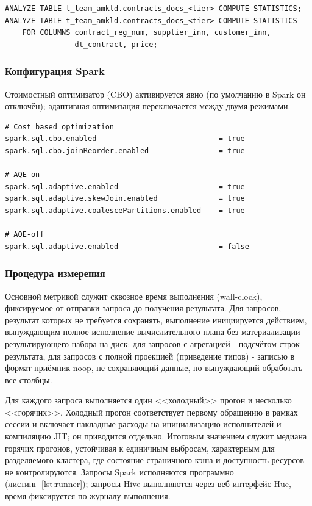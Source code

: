 \documentclass[12pt,letterpaper, onecolumn]{exam}
\begin{document}
\begin{lstlisting}[style=sparkconf, caption={Сбор статистики}, label={lst:analyze}]
ANALYZE TABLE t_team_amkld.contracts_docs_<tier> COMPUTE STATISTICS;
ANALYZE TABLE t_team_amkld.contracts_docs_<tier> COMPUTE STATISTICS
    FOR COLUMNS contract_reg_num, supplier_inn, customer_inn,
                dt_contract, price;
\end{lstlisting}

\subsubsection{Конфигурация Spark}
Стоимостный оптимизатор (CBO) активируется явно (по умолчанию в Spark он отключён);
адаптивная оптимизация переключается между двумя режимами.

\begin{lstlisting}[style=sparkconf, caption={Конфигурация CBO и AQE в Spark}, label={lst:spark-opt}]
# Cost based optimization
spark.sql.cbo.enabled                            = true
spark.sql.cbo.joinReorder.enabled                = true

# AQE-on
spark.sql.adaptive.enabled                       = true
spark.sql.adaptive.skewJoin.enabled              = true
spark.sql.adaptive.coalescePartitions.enabled    = true

# AQE-off
spark.sql.adaptive.enabled                       = false
\end{lstlisting}

\subsubsection{Процедура измерения}
Основной метрикой служит сквозное время выполнения (wall-clock), фиксируемое
от отправки запроса до получения результата. Для запросов, результат которых
не требуется сохранять, выполнение инициируется действием, вынуждающим полное
исполнение вычислительного плана без материализации результирующего набора
на диск: для запросов с агрегацией - подсчётом строк результата, для запросов
с полной проекцией (приведение типов) - записью в формат-приёмник noop,
не сохраняющий данные, но вынуждающий обработать все столбцы.

Для каждого запроса выполняется один <<холодный>> прогон и несколько
<<горячих>>. Холодный прогон соответствует первому обращению в рамках сессии
и включает накладные расходы на инициализацию исполнителей и компиляцию JIT;
он приводится отдельно. Итоговым значением служит медиана горячих прогонов,
устойчивая к единичным выбросам, характерным для разделяемого кластера, где
состояние страничного кэша и доступность ресурсов не контролируются.
Запросы Spark исполняются программно (листинг~\ref{lst:runner}); запросы Hive
выполняются через веб-интерфейс Hue, время фиксируется по журналу выполнения.
\end{document}
